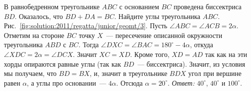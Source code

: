 \problem
В равнобедренном треугольнике $ABC$ с основанием $BC$ проведена биссектриса
$BD$.
Оказалось, что $BD + DA = BC$.
Найдите углы треугольника $ABC$.
%
\label{solution:2011/regatta/junior/geomt/3}%
Рис.~\ref{fig:solution:2011/regatta/junior/geomt/3}.
Пусть $\angle ABC = \angle ACB = 2 \alpha$.
Отметим на стороне $BC$ точку $X$~--- пересечение описанной окружности
треугольника $ABD$ с $BC$.
Тогда
$\angle DXC = \angle BAC = 180^\circ - 4 \alpha$,
откуда $\angle XDC = 2 \alpha = \angle DCX$.
Значит $XC = XD$.
Кроме того, $XD = AD$ так как на эти хорды опираются равные углы
(так как $BD$~--- биссектриса).
Значит, из условия мы получаем, что $BD = BX$, и, значит в треугольнике $BDX$
угол при вершине равен $\alpha$, а углы про основании~--- $4 \alpha$.
Отсюда $\alpha = 20^\circ$.
\emph{Ответ:}
$40^\circ$, $40^\circ$ и $100^\circ$.
\endproblem
